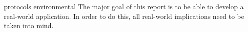 protocols environmental
The major goal of this report is to be able to develop a real-world application. In order to do this,
all real-world implications need to be taken into mind. 

